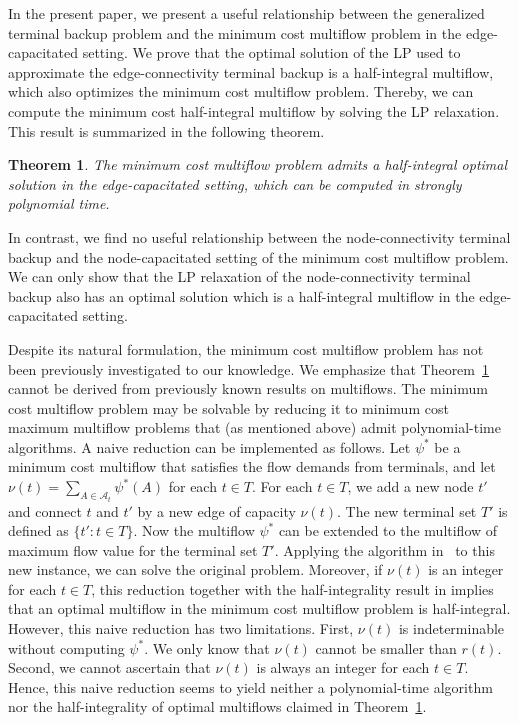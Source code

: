 \documentclass{article}
\newtheorem{theorem}{Theorem}
\newcommand{\Afam}{\mathcal{A}}
\begin{document}
In the present paper, we present a useful relationship 
between the generalized terminal backup problem
and
the minimum cost multiflow problem in the edge-capacitated setting.
We prove that the optimal solution of the LP
used to approximate the edge-connectivity terminal backup is a half-integral multiflow,
which also optimizes the minimum cost multiflow problem.
Thereby, we can compute the minimum cost half-integral multiflow by
solving the LP relaxation. This result is summarized in the following theorem.

\begin{theorem} \label{thm:flow}
The minimum cost multiflow problem admits a half-integral optimal solution in the edge-capacitated 
setting, which can be computed in strongly polynomial time.
\end{theorem}

In contrast, we find no useful relationship between the node-connectivity terminal backup
and the node-capacitated setting of the minimum cost multiflow problem.
We can only show that the LP relaxation of the node-connectivity terminal backup also
has an optimal solution which is a half-integral multiflow in the edge-capacitated setting.


Despite its natural formulation,
the minimum cost multiflow problem has not been previously investigated to our knowledge.
We emphasize that Theorem~\ref{thm:flow} cannot be derived from previously known results on multiflows.
The minimum cost multiflow problem
may be solvable 
by reducing it to minimum cost maximum multiflow problems that (as mentioned above)
admit polynomial-time algorithms.
A naive reduction can be implemented as follows.
Let $\psi^*$ be a minimum cost multiflow that satisfies the flow demands from terminals, and let
$\nu(t)=\sum_{A \in \Afam_t}\psi^*(A)$
for each $t \in T$. 
For each $t \in T$,
we add a new node $t'$ and connect $t$ and $t'$ by a new edge of capacity $\nu(t)$.
The new terminal set $T'$ is defined as $\{t' \colon t \in T\}$.
Now the multiflow $\psi^*$ can be extended to the multiflow of maximum flow value for the terminal
set $T'$. Applying
the algorithm in~\cite{Karzanov94} to this new instance,
we can solve the original problem.
Moreover, if $\nu(t)$ is an integer for each $t \in T$,
this reduction together with the half-integrality result in \cite{Karzanov79,Karzanov94} implies that 
an optimal multiflow in the minimum cost multiflow problem is half-integral.
However, this naive reduction has two limitations. First, $\nu(t)$ is indeterminable
without computing $\psi^*$. We only know that $\nu(t)$ cannot be smaller than $r(t)$.
Second, we cannot ascertain that $\nu(t)$ is always an integer for each $t \in T$.
Hence, this naive reduction
seems to yield neither a polynomial-time algorithm nor the half-integrality of optimal
multiflows claimed in Theorem~\ref{thm:flow}.
\end{document}
